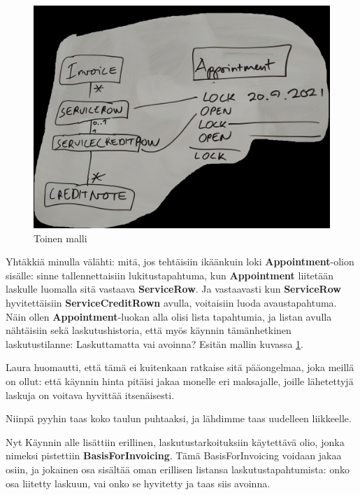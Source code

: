 \begin{figure}
\centering
\includegraphics[width=\textwidth,height=0.5\textheight]{illustration/malli2.jpg}
\caption{\label{diarymalli2}Toinen malli}
\end{figure}

Yhtäkkiä minulla välähti: mitä, jos tehtäisiin ikäänkuin loki
\textbf{Appointment}-olion sisälle: sinne tallennettaisiin
lukitustapahtuma, kun \textbf{Appointment} liitetään laskulle luomalla
sitä vastaava \textbf{ServiceRow}. Ja vastaavasti kun
\textbf{ServiceRow} hyvitettäisiin \textbf{ServiceCreditRown} avulla,
voitaisiin luoda avaustapahtuma. Näin ollen \textbf{Appointment}-luokan
alla olisi lista tapahtumia, ja listan avulla nähtäisiin sekä
laskutushistoria, että myös käynnin tämänhetkinen laskutustilanne:
Laskuttamatta vai avoinna? Esitän mallin kuvassa \ref{diarymalli2}.

Laura huomautti, että tämä ei kuitenkaan ratkaise sitä pääongelmaa, joka
meillä on ollut: että käynnin hinta pitäisi jakaa monelle eri
maksajalle, joille lähetettyjä laskuja on voitava hyvittää itsenäisesti.

Niinpä pyyhin taas koko taulun puhtaaksi, ja lähdimme taas uudelleen
liikkeelle.

Nyt Käynnin alle lisättiin erillinen, laskutustarkoituksiin käytettävä
olio, jonka nimeksi pistettiin \textbf{BasisForInvoicing}. Tämä
BasisForInvoicing voidaan jakaa osiin, ja jokainen osa sisältää oman
erillisen listansa laskutustapahtumista: onko osa liitetty laskuun, vai
onko se hyvitetty ja taas siis avoinna.

